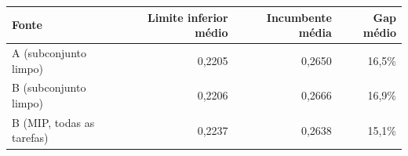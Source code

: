 \begin{tabular}{lrrr}
\toprule
Fonte & Limite inferior médio & Incumbente média & Gap médio \\
\midrule
A (subconjunto limpo) & 0,2205 & 0,2650 & 16,5\% \\
B (subconjunto limpo) & 0,2206 & 0,2666 & 16,9\% \\
B (MIP, todas as tarefas) & 0,2237 & 0,2638 & 15,1\% \\
\bottomrule
\end{tabular}
